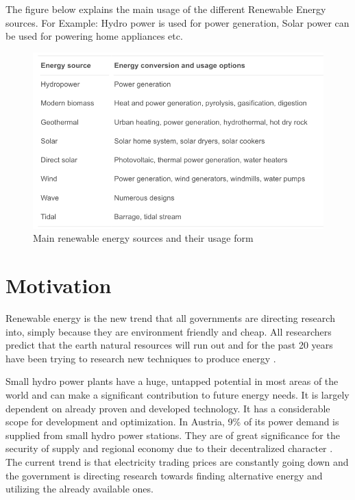  The figure below explains the main usage of the different Renewable Energy sources. For Example: Hydro power is used for power generation, Solar power can be used for powering home appliances etc.
\begin{figure}[H]
\centering
\includegraphics[scale=0.4]{Images/Types_of_Renewable_Sources.png}
\caption[Main renewable energy sources and their usage form]{Main renewable energy sources and their usage form \cite{panwar2011role}}
\end{figure}
\section{Motivation}          
\label{sec:Motivation}
Renewable energy is the new trend that all governments are directing research into, simply because they are environment friendly and cheap. All researchers predict that the earth natural resources will run out and for the past 20 years have been trying to research new techniques to produce energy \cite{SEIT2017}.

Small hydro power plants have a huge, untapped potential in most areas of the world and can make a significant contribution to future energy needs. It is largely dependent on already proven and developed technology. It has a considerable scope for development and optimization. In Austria, 9\% of its power demand is supplied from small hydro power stations. They are of great significance for the security of supply and regional economy due to their decentralized character \cite{SEIT2017}. The current trend is that electricity trading prices are constantly going down and the government is directing research towards finding alternative energy and utilizing the already available ones.
